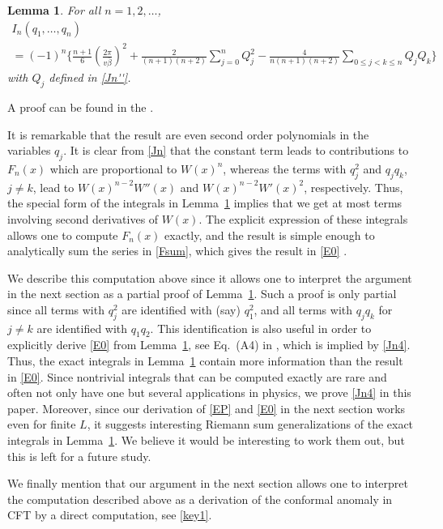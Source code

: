 \documentclass[12pt,a4paper]{article}
\newtheorem{lemma}[theorem]{Lemma}
\theoremstyle{definition}
\theoremstyle{remark}
\begin{document}
\begin{lemma}
\label{lemma:In} 
For all $n=1,2,\ldots$, 
\begin{multline}
\label{Jn4}
I_n(q_1,\ldots,q_n) \\
= (-1)^{n} \Biggl\{ \frac{n+1}{6} \left( \frac{2\pi}{v\bar\beta} \right)^2
	+ \frac{2}{(n+1)(n+2)} \sum_{j=0}^{n} Q_j^2
	- \frac{4}{n(n+1)(n+2)} \sum_{0 \leq j< k \leq n} Q_j Q_k \Biggr\}
\end{multline}
%
with $Q_j$ defined in \eqref{Jn''}.
\end{lemma}

\noindent A proof can be found in the .

It is remarkable that the result are even second order polynomials in the variables $q_j$.
It is clear from \eqref{Jn} that the constant term leads to contributions to $F_n(x)$ which are proportional to $W(x)^n$, whereas the terms with $q_j^2$ and $q_jq_k$, $j\neq k$, lead to $W(x)^{n-2}W''(x)$ and $W(x)^{n-2}W'(x)^2$, respectively.
Thus, the special form of the integrals in Lemma~\ref{lemma:In} implies that we get at most terms involving second derivatives of $W(x)$.
The explicit expression of these integrals allows one to compute $F_n(x)$ exactly, and the result is simple enough to analytically sum the series in \eqref{Fsum}, which gives the result in \eqref{E0} \cite{LLMM2}. 

We describe this computation above since it allows one to interpret the argument in the next section as a partial proof of Lemma~\ref{lemma:In}.
Such a proof is only partial since all terms with $q_j^2$ are identified with (say) $q_1^2$, and all terms with $q_jq_k$ for $j\neq k$ are identified with $q_1q_2$.
This identification is also useful in order to explicitly derive \eqref{E0} from Lemma~\ref{lemma:In}, see Eq.\ (A4) in \cite{LLMM2}, which is implied by \eqref{Jn4}.
Thus, the exact integrals in Lemma~\ref{lemma:In} contain more information than the result in \eqref{E0}.
Since nontrivial integrals that can be computed exactly are rare and often not only have one but several applications in physics, we prove \eqref{Jn4} in this paper.
Moreover, since our derivation of \eqref{EP} and \eqref{E0} in the next section works even for finite $L$, it suggests interesting Riemann sum generalizations of the exact integrals in Lemma~\ref{lemma:In}.
We believe it would be interesting to work them out, but this is left for a future study. 

We finally mention that our argument in the next section allows one to interpret the computation described above as a derivation of the conformal anomaly in CFT by a direct computation, see \eqref{key1}.
\end{document}
